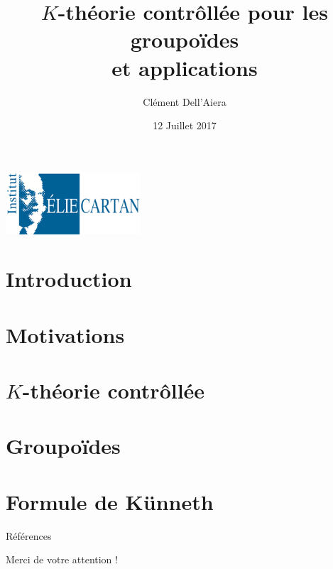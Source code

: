 \documentclass{beamer}
\title[First Steps with SCRATCH]{$K$-théorie contrôllée pour les groupoïdes\\ et applications}
\author{Clément Dell'Aiera}
\institute{IECL}
\date{12 Juillet 2017}
\begin{document}
\begin{frame}
  \titlepage
\begin{center}\includegraphics[width=5cm]{IECL.png}\end{center}
\end{frame}

\begin{frame}
  \tableofcontents
\end{frame}

\section{Introduction}


\section{Motivations}


\section{$K$-théorie contrôllée}


%

\section{Groupoïdes}
\begin{frame}
  \tableofcontents[currentsection]
\end{frame}




\section{Formule de Künneth}




\begin{frame}{Références}


\end{frame} 

\begin{frame}{}
Merci de votre attention !
\end{frame}
\end{document}
